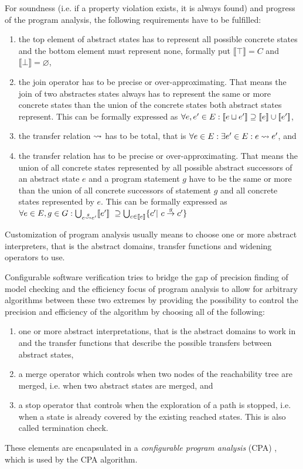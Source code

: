 For soundness (i.e. if a property violation exists, it is always found) and progress of the program analysis, the following requirements have to be fulfilled:\cite{Beyer2007}
\begin{enumerate}[label=\alph*)]
\item the top element of abstract states has to represent all possible concrete states and the bottom element must represent none, formally put $\llbracket \top \rrbracket = C$ and $\llbracket \bot \rrbracket = \varnothing$,
\item the join operator has to be precise or over-approximating. That means the join of two abstractes states always has to represent the same or more concrete states than the union of the concrete states both abstract states represent. This can be formally expressed as $\forall e, e' \in E: [\![ e \sqcup e' ]\!] \supseteq [\![ e ]\!] \cup [\![ e' ]\!]$,
\item the transfer relation $\rightsquigarrow$ has to be total, that is $\forall e \in E: \exists e' \in E: e \rightsquigarrow e'$, and
\item the transfer relation has to be precise or over-approximating. That means the union of all concrete states represented by all possible abstract successors of an abstract state $e$ and a program statement $g$ have to be the same or more than the union of all concrete successors of statement $g$ and all concrete states represented by $e$.
This can be formally expressed as $\forall e \in E, g \in G: \bigcup_{e \gtransfer e'} \llbracket e' \rrbracket\ \supseteq \bigcup_{c \in \llbracket e \rrbracket} \{ c' |\ c \overset{g}{\rightarrow} c' \}$
\end{enumerate}
Customization of program analysis usually means to choose one or more abstract interpreters, that is the abstract domains, transfer functions and widening operators to use.\cite{Beyer2007}

Configurable software verification tries to bridge the gap of precision finding of model checking and the efficiency focus of program analysis to allow for arbitrary algorithms between these two extremes by providing the possibility to control the precision and efficiency of the algorithm by choosing all of the following:
\begin{enumerate}[label=\alph*)]
\item one or more abstract interpretations, that is the abstract domains to work in and the transfer functions that describe the possible transfers between abstract states,
\item a merge operator which controls when two nodes of the reachability tree are merged, i.e. when two abstract states are merged, and
\item a stop operator that controls when the exploration of a path is stopped, i.e. when a state is already covered by the existing reached states. This is also called termination check.
\end{enumerate}
These elements are encapsulated in a \emph{configurable program analysis} (CPA) \cite{Beyer2007} , which is used by the CPA algorithm.

